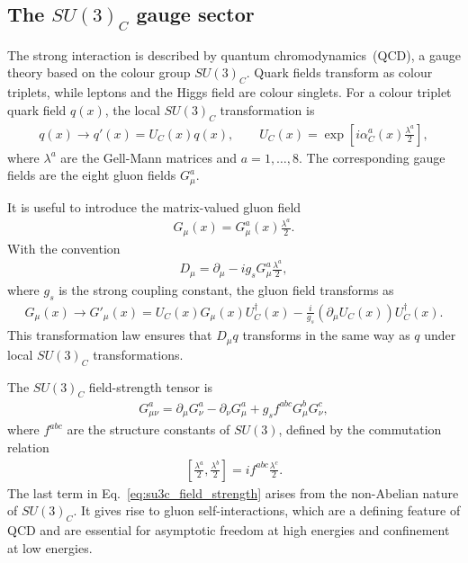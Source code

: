 \subsection{The $SU(3)_{C}$ gauge sector}
\label{subsec:su3c_gauge_sector}

The strong interaction is described by quantum chromodynamics~(QCD), a gauge theory based on the colour group $SU(3)_{C}$. 
Quark fields transform as colour triplets, while leptons and the Higgs field are colour singlets. 
For a colour triplet quark field $q(x)$, the local $SU(3)_{C}$ transformation is
\begin{align}
    q(x)
    \rightarrow
    q'(x)
    =
    U_{C}(x)q(x),
    \qquad
    U_{C}(x)
    =
    \exp\left[
        i\alpha_{C}^{a}(x)\frac{\lambda^{a}}{2}
    \right],
    \label{eq:su3c_matter_transformation}
\end{align}
where $\lambda^{a}$ are the Gell-Mann matrices and $a=1,\ldots,8$. 
The corresponding gauge fields are the eight gluon fields $G_{\mu}^{a}$.

It is useful to introduce the matrix-valued gluon field
\begin{align}
    G_{\mu}(x)
    =
    G_{\mu}^{a}(x)\frac{\lambda^{a}}{2}.
    \label{eq:gluon_field_matrix}
\end{align}
With the convention
\begin{align}
    D_{\mu}
    =
    \partial_{\mu}
    -
    ig_{s}G_{\mu}^{a}\frac{\lambda^{a}}{2},
    \label{eq:su3c_covariant_derivative}
\end{align}
where $g_{s}$ is the strong coupling constant, the gluon field transforms as
\begin{align}
    G_{\mu}(x)
    \rightarrow
    G'_{\mu}(x)
    =
    U_{C}(x)G_{\mu}(x)U_{C}^{\dagger}(x)
    -
    \frac{i}{g_{s}}
    \left(\partial_{\mu}U_{C}(x)\right)U_{C}^{\dagger}(x).
    \label{eq:su3c_gauge_field_transformation}
\end{align}
This transformation law ensures that $D_{\mu}q$ transforms in the same way as $q$ under local $SU(3)_{C}$ transformations.

The $SU(3)_{C}$ field-strength tensor is
\begin{align}
    G_{\mu\nu}^{a}
    =
    \partial_{\mu}G_{\nu}^{a}
    -
    \partial_{\nu}G_{\mu}^{a}
    +
    g_{s}f^{abc}G_{\mu}^{b}G_{\nu}^{c},
    \label{eq:su3c_field_strength}
\end{align}
where $f^{abc}$ are the structure constants of $SU(3)$, defined by the commutation relation
\begin{align}
    \left[
        \frac{\lambda^{a}}{2},
        \frac{\lambda^{b}}{2}
    \right]
    =
    i f^{abc}\frac{\lambda^{c}}{2}.
    \label{eq:su3c_structure_constants}
\end{align}
The last term in Eq.~\eqref{eq:su3c_field_strength} arises from the non-Abelian nature of $SU(3)_{C}$. 
It gives rise to gluon self-interactions, which are a defining feature of QCD and are essential for asymptotic freedom at high energies and confinement at low energies.


